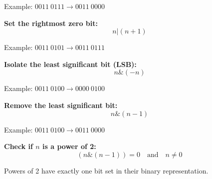 Example: $0011\ 0111 \rightarrow 0011\ 0000$

\textbf{Set the rightmost zero bit:}
\begin{equation}
    n | (n + 1)
\end{equation}

Example: $0011\ 0101 \rightarrow 0011\ 0111$

\textbf{Isolate the least significant bit (LSB):}
\begin{equation}
    n \& (-n)
\end{equation}

Example: $0011\ 0100 \rightarrow 0000\ 0100$

\textbf{Remove the least significant bit:}
\begin{equation}
    n \& (n - 1)
\end{equation}

Example: $0011\ 0100 \rightarrow 0011\ 0000$

\textbf{Check if $n$ is a power of 2:}
\begin{equation}
    (n \& (n - 1)) = 0 \quad \text{and} \quad n \neq 0
\end{equation}

Powers of 2 have exactly one bit set in their binary representation.
